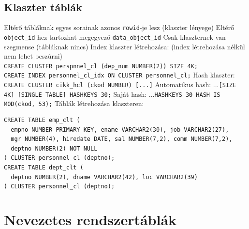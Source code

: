 \documentclass[12pt,a4paper]{article}
\begin{document}
\subsection{Klaszter táblák}

\begin{outline}
	\1 Eltérő tábláknak egyes sorainak azonos \texttt{rowid}-je lesz (klaszter lényege)
	\1 Eltérő \texttt{object\_id}-hez tartozhat megegyező \texttt{data\_object\_id}
	\1 Csak klaszternek van szegmense (tábláknak nincs)
	\1 Index klaszter létrehozása: (index létrehozása nélkül nem lehet beszúrni)\\
	\texttt{CREATE CLUSTER perspnnel\_cl (dep\_num NUMBER(2)) SIZE 4K;}\\
	\texttt{CREATE INDEX personnel\_cl\_idx ON CLUSTER personnel\_cl;}
	\1 Hash klaszter: \texttt{CREATE CLUSTER cikk\_hcl (ckod NUMBER) [...]}
		\2 Automatikus hash: ...\texttt{[SIZE 4K] [SINGLE TABLE] HASHKEYS 30;}
		\2 Saját hash: ...\texttt{HASHKEYS 30 HASH IS MOD(ckod, 53);}
	\1 Táblák létrehozása klaszteren: \begin{verbatim}
CREATE TABLE emp_clt (
  empno NUMBER PRIMARY KEY, ename VARCHAR2(30), job VARCHAR2(27),
  mgr NUMBER(4), hiredate DATE, sal NUMBER(7,2), comm NUMBER(7,2), 
  deptno NUMBER(2) NOT NULL
) CLUSTER personnel_cl (deptno);
CREATE TABLE dept_clt (
  deptno NUMBER(2), dname VARCHAR2(42), loc VARCHAR2(39)
) CLUSTER personnel_cl (deptno);
	\end{verbatim}
\end{outline}

\pagebreak

\section{Nevezetes rendszertáblák}
\end{document}
